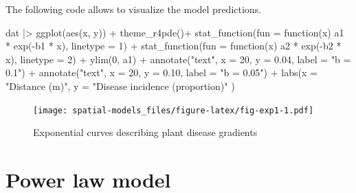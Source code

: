 \documentclass[
  letterpaper,
]{book}
\newenvironment{Shaded}{\begin{snugshade}}{\end{snugshade}}
\newcommand{\AttributeTok}[1]{\textcolor[rgb]{0.40,0.45,0.13}{#1}}
\newcommand{\ControlFlowTok}[1]{\textcolor[rgb]{0.00,0.23,0.31}{#1}}
\newcommand{\DecValTok}[1]{\textcolor[rgb]{0.68,0.00,0.00}{#1}}
\newcommand{\FloatTok}[1]{\textcolor[rgb]{0.68,0.00,0.00}{#1}}
\newcommand{\FunctionTok}[1]{\textcolor[rgb]{0.28,0.35,0.67}{#1}}
\newcommand{\NormalTok}[1]{\textcolor[rgb]{0.00,0.23,0.31}{#1}}
\newcommand{\SpecialCharTok}[1]{\textcolor[rgb]{0.37,0.37,0.37}{#1}}
\newcommand{\StringTok}[1]{\textcolor[rgb]{0.13,0.47,0.30}{#1}}
\begin{document}
The following code allows to visualize the model predictions.

\begin{Shaded}
\begin{Highlighting}[]
\NormalTok{dat }\SpecialCharTok{|\textgreater{}}
  \FunctionTok{ggplot}\NormalTok{(}\FunctionTok{aes}\NormalTok{(x, y)) }\SpecialCharTok{+}
  \FunctionTok{theme\_r4pde}\NormalTok{()}\SpecialCharTok{+}
  \FunctionTok{stat\_function}\NormalTok{(}\AttributeTok{fun =} \ControlFlowTok{function}\NormalTok{(x) a1 }\SpecialCharTok{*} \FunctionTok{exp}\NormalTok{(}\SpecialCharTok{{-}}\NormalTok{b1 }\SpecialCharTok{*}\NormalTok{ x), }\AttributeTok{linetype =} \DecValTok{1}\NormalTok{) }\SpecialCharTok{+}
  \FunctionTok{stat\_function}\NormalTok{(}\AttributeTok{fun =} \ControlFlowTok{function}\NormalTok{(x) a2 }\SpecialCharTok{*} \FunctionTok{exp}\NormalTok{(}\SpecialCharTok{{-}}\NormalTok{b2 }\SpecialCharTok{*}\NormalTok{ x), }\AttributeTok{linetype =} \DecValTok{2}\NormalTok{) }\SpecialCharTok{+}
  \FunctionTok{ylim}\NormalTok{(}\DecValTok{0}\NormalTok{, a1) }\SpecialCharTok{+}
  \FunctionTok{annotate}\NormalTok{(}\StringTok{"text"}\NormalTok{, }\AttributeTok{x =} \DecValTok{20}\NormalTok{, }\AttributeTok{y =} \FloatTok{0.04}\NormalTok{, }\AttributeTok{label =} \StringTok{"b = 0.1"}\NormalTok{) }\SpecialCharTok{+}
  \FunctionTok{annotate}\NormalTok{(}\StringTok{"text"}\NormalTok{, }\AttributeTok{x =} \DecValTok{20}\NormalTok{, }\AttributeTok{y =} \FloatTok{0.10}\NormalTok{, }\AttributeTok{label =} \StringTok{"b = 0.05"}\NormalTok{) }\SpecialCharTok{+}
  \FunctionTok{labs}\NormalTok{(}\AttributeTok{x =} \StringTok{"Distance (m)"}\NormalTok{, }\AttributeTok{y =} \StringTok{"Disease incidence (proportion)"}
\NormalTok{  )}
\end{Highlighting}
\end{Shaded}

\begin{figure}

{\centering \texttt{[image: spatial-models\_files/figure-latex/fig-exp1-1.pdf]}

}

\caption{\label{fig-exp1}Exponential curves describing plant disease
gradients}

\end{figure}

\hypertarget{power-law-model}{%
\section{Power law model}\label{power-law-model}}
\end{document}
